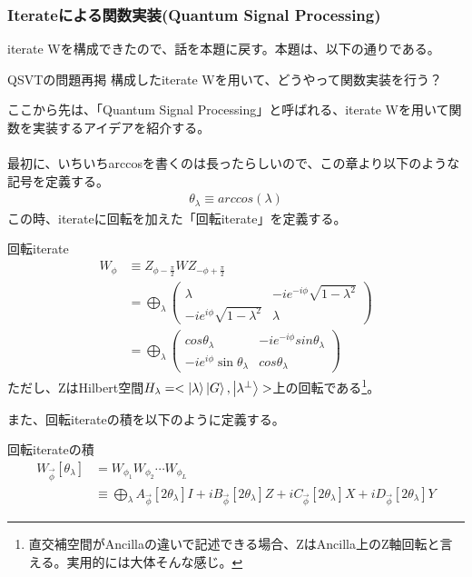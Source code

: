 \documentclass[a4paper,10.5pt]{article}
\numberwithin{equation}{section}
\begin{document}
\subsubsection{Iterateによる関数実装(Quantum Signal Processing)}
iterate Wを構成できたので、話を本題に戻す。本題は、以下の通りである。
\begin{problembox}{QSVTの問題再掲}
    構成したiterate Wを用いて、どうやって関数実装を行う？
\end{problembox}
ここから先は、「Quantum Signal Processing」と呼ばれる、iterate Wを用いて関数を実装するアイデアを紹介する。\\
\\
最初に、いちいちarccosを書くのは長ったらしいので、この章より以下のような記号を定義する。
\begin{align*}
    \theta_{\lambda}\equiv arccos(\lambda)
\end{align*}
この時、iterateに回転を加えた「回転iterate」を定義する。
\begin{defbox}{回転iterate}
    \begin{align*}
        W_{\phi} &\equiv Z_{\phi-\frac{\pi}{2}} WZ_{-\phi+\frac{\pi}{2}} \\&= \bigoplus_{\lambda} \begin{pmatrix}
            \lambda & -ie^{-i\phi}\sqrt{1-\lambda^{2}}\\
            -ie^{i\phi}\sqrt{1-\lambda^{2}} & \lambda
        \end{pmatrix} 
        \\&= \bigoplus_{\lambda} \begin{pmatrix}
            cos\theta_{\lambda} & -ie^{-i\phi}sin\theta_{\lambda}\\
            -ie^{i\phi}\sin\theta_{\lambda} & cos\theta_{\lambda}
        \end{pmatrix} 
    \end{align*}
    ただし、ZはHilbert空間$
        H_{\lambda}=<\ket{\lambda}\ket{G},\ket{\lambda^{\perp}}>
    $上の回転である\footnote{直交補空間がAncillaの違いで記述できる場合、ZはAncilla上のZ軸回転と言える。実用的には大体そんな感じ。}。
\end{defbox}
また、回転iterateの積を以下のように定義する。
\begin{defbox}{回転iterateの積}
    \begin{align*}
        W_{\vec{\phi}}[\theta_{\lambda}]&=W_{\phi_{1}}W_{\phi_{2}}\cdots W_{\phi_{L}}\\
        &\equiv \bigoplus_{\lambda} 
        A_{\vec{\phi}}[2\theta_{\lambda}]I+
        iB_{\vec{\phi}}[2\theta_{\lambda}]Z+iC_{\vec{\phi}}[2\theta_{\lambda}]X+iD_{\vec{\phi}}[2\theta_{\lambda}]Y
    \end{align*}
\end{defbox}
\end{document}
